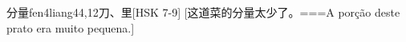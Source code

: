 \begin{EntryWithPhonetic}{分量}{fen4liang4}{4,12}{⼑、⾥}[HSK 7-9]
  [这道菜的分量太少了。===A porção deste prato era muito pequena.]
\end{EntryWithPhonetic}
